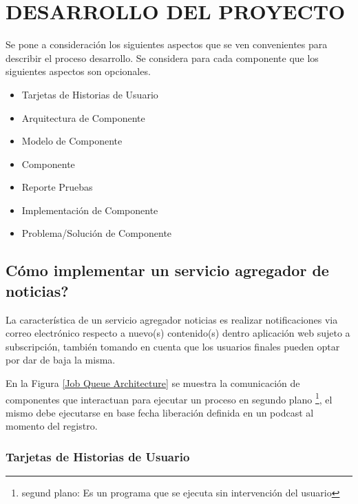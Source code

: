 \chapter{DESARROLLO DEL PROYECTO}

Se pone a consideraci\'{o}n los siguientes aspectos que se ven convenientes para
describir el proceso desarrollo. Se considera para cada componente que los 
siguientes aspectos son opcionales.

\begin{itemize}

\item Tarjetas de Historias de Usuario
\item Arquitectura de Componente
\item Modelo de Componente
\item Componente
\item Reporte Pruebas
\item Implementaci\'{o}n de Componente
\item Problema/Soluci\'{o}n de Componente

\end{itemize}

\section{\textquestiondown C\'{o}mo implementar un servicio agregador de noticias?} \label{RSS}

La caracter\'{i}stica de un servicio agregador noticias es realizar notificaciones
via correo electr\'{o}nico respecto a nuevo(s) contenido(s) dentro aplicaci\'{o}n
web sujeto a subscripci\'{o}n, tambi\'{e}n tomando en cuenta que los usuarios 
finales pueden optar por dar de baja la misma. 

\begin{minipage}{1.0\textwidth}
	\centering
	\label{Job Queue Architecture}
\end{minipage}

En la Figura \ref{Job Queue Architecture} se muestra la comunicaci\'{o}n de
componentes que interactuan para ejecutar un proceso en segundo plano 
\footnote{segund plano: Es un programa que se ejecuta sin intervenci\'{o}n del
usuario}, el mismo debe ejecutarse en base fecha liberaci\'{o}n definida en un
podcast al momento del registro.   

\subsection{Tarjetas de Historias de Usuario}

